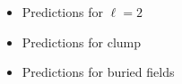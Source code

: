\begin{itemize}
\item Predictions for $\ell = 2$
\item Predictions for clump 
\item Predictions for buried fields
\end{itemize}